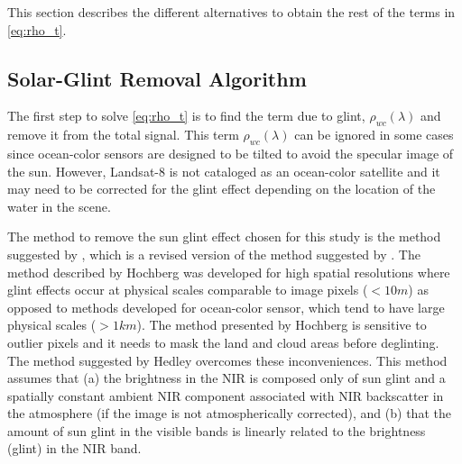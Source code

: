 This section describes the different alternatives to obtain the rest of the terms in \autoref{eq:rho_t}.

\subsection{Solar-Glint Removal Algorithm}
\label{subsec:glintremoval}
The first step to solve \autoref{eq:rho_t} is to find the term due to glint, $\rho_{wc}(\lambda)$ and remove it from the total signal. This term $\rho_{wc}(\lambda)$ can be ignored in some cases since ocean-color sensors are designed to be tilted to avoid the specular image of the sun. However, Landsat-8 is not cataloged as an ocean-color satellite and it may need to be corrected for the glint effect depending on the location of the water in the scene.

The method to remove the sun glint effect chosen for this study is the method suggested by \cite{Hedley:2005}, which is a revised version of the method suggested by \cite{Hochberg:2003}. The method described by Hochberg was developed for high spatial resolutions where glint effects occur at physical scales comparable to image pixels ($<10m$) as opposed to methods developed for ocean-color sensor, which tend to have large physical scales ($>1km$).
The method presented by Hochberg is sensitive to outlier pixels and it needs to mask the land and cloud areas before deglinting. The method suggested by Hedley overcomes these inconveniences. This method assumes that (a) the brightness in the NIR is composed only of sun glint and a spatially constant ambient NIR component associated with NIR backscatter in the atmosphere (if the image is not atmospherically corrected), and (b) that the amount of sun glint in the visible bands is linearly related to the brightness (glint) in the NIR band. 

